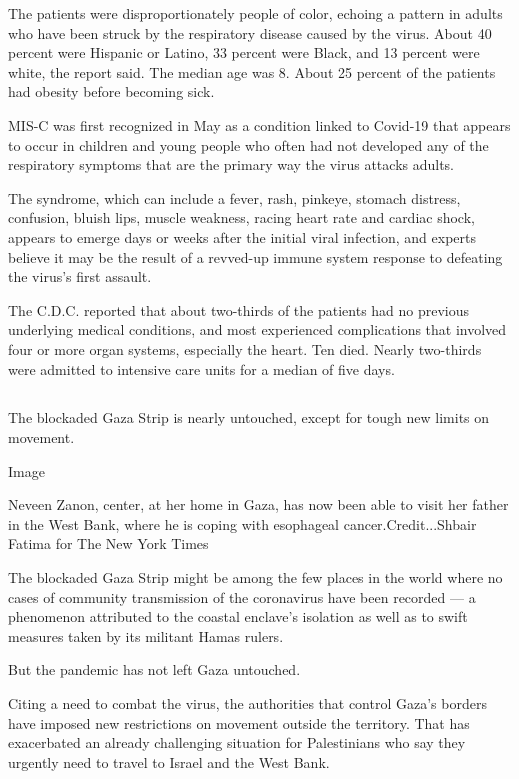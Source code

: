 The patients were disproportionately people of color, echoing a pattern
in adults who have been struck by the respiratory disease caused by the
virus. About 40 percent were Hispanic or Latino, 33 percent were Black,
and 13 percent were white, the report said. The median age was 8. About
25 percent of the patients had obesity before becoming sick.

MIS-C was first recognized in May as a condition linked to Covid-19 that
appears to occur in children and young people who often had not
developed any of the respiratory symptoms that are the primary way the
virus attacks adults.

The syndrome, which can include a fever, rash, pinkeye, stomach
distress, confusion, bluish lips, muscle weakness, racing heart rate and
cardiac shock, appears to emerge days or weeks after the initial viral
infection, and experts believe it may be the result of a revved-up
immune system response to defeating the virus's first assault.

The C.D.C. reported that about two-thirds of the patients had no
previous underlying medical conditions, and most experienced
complications that involved four or more organ systems, especially the
heart. Ten died. Nearly two-thirds were admitted to intensive care units
for a median of five days.

\hypertarget{section-4}{%
\subsection{}\label{section-4}}

The blockaded Gaza Strip is nearly untouched, except for tough new
limits on movement.

Image

Neveen Zanon, center, at her home in Gaza, has now been able to visit
her father in the West Bank, where he is coping with esophageal
cancer.Credit...Shbair Fatima for The New York Times

The blockaded Gaza Strip might be among the few places in the world
where no cases of community transmission of the coronavirus have been
recorded --- a phenomenon attributed to the coastal enclave's isolation
as well as to swift measures taken by its militant Hamas rulers.

But the pandemic has not left Gaza untouched.

Citing a need to combat the virus, the authorities that control Gaza's
borders have imposed new restrictions on movement outside the territory.
That has exacerbated an already challenging situation for Palestinians
who say they urgently need to travel to Israel and the West Bank.

